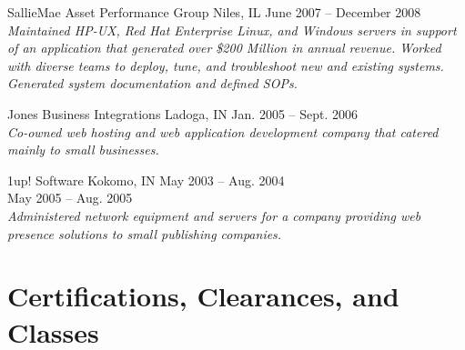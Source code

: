 \documentclass[9pt]{extarticle} %
\begin{document}
\bigskip



\begin{indented}
	SallieMae Asset Performance Group \tab Niles, IL \tab June 2007 -- December 2008\\
	\textit{Maintained HP-UX, Red Hat Enterprise Linux, and Windows servers in support of an application that generated over \$200 Million in annual revenue. Worked with diverse teams to deploy, tune, and troubleshoot new and existing systems. Generated system documentation and defined SOPs.}
\end{indented}

\bigskip



\begin{indented}
	Jones Business Integrations \tab Ladoga, IN \tab Jan. 2005 -- Sept. 2006\\
	\textit{Co-owned web hosting and web application development company that catered mainly to small businesses.}
\end{indented}

\bigskip



\begin{indented}
	1up! Software \tab Kokomo, IN \tab May 2003 -- Aug. 2004\\
	\tab \tab May 2005 -- Aug. 2005\\
	\textit{Administered network equipment and servers for a company providing web presence solutions to small publishing companies.}
\end{indented}


\section{Certifications, Clearances, and Classes}
\end{document}
